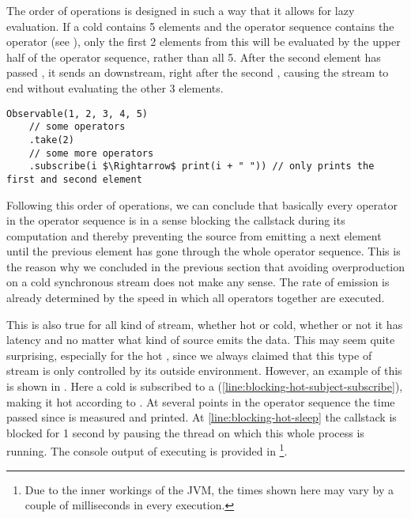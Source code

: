 The order of operations is designed in such a way that it allows for lazy evaluation. If a cold \obs contains 5 elements and the operator sequence contains the operator  (see ), only the first 2 elements from this \obs will be evaluated by the upper half of the operator sequence, rather than all 5. After the second element has passed , it sends an  downstream, right after the second , causing the stream to end without evaluating the other 3 elements.

\begin{minipage}{\linewidth}
\begin{lstlisting}[style=ScalaStyle, caption={Lazy evaluation}, label={lst:lazy}]
Observable(1, 2, 3, 4, 5)
    // some operators
    .take(2)
    // some more operators
    .subscribe(i $\Rightarrow$ print(i + " ")) // only prints the first and second element
\end{lstlisting}
\end{minipage}

Following this order of operations, we can conclude that basically every operator in the operator sequence is in a sense blocking the callstack during its computation and thereby preventing the source from emitting a next element until the previous element has gone through the whole operator sequence. This is the reason why we concluded in the previous section that avoiding overproduction on a cold synchronous stream does not make any sense. The rate of emission is already determined by the speed in which all operators together are executed.

This is also true for all kind of stream, whether hot or cold, whether or not it has latency and no matter what kind of source emits the data. This may seem quite surprising, especially for the hot \obs, since we always claimed that this type of stream is only controlled by its outside environment. However, an example of this is shown in . Here a cold \obs is subscribed to a \subj (\cref{line:blocking-hot-subject-subscribe}), making it hot according to . At several points in the operator sequence the time passed since  is measured and printed. At \cref{line:blocking-hot-sleep} the callstack is blocked for 1 second by pausing the thread on which this whole process is running. The console output of executing  is provided in \footnote{Due to the inner workings of the JVM, the times shown here may vary by a couple of milliseconds in every execution.}.

